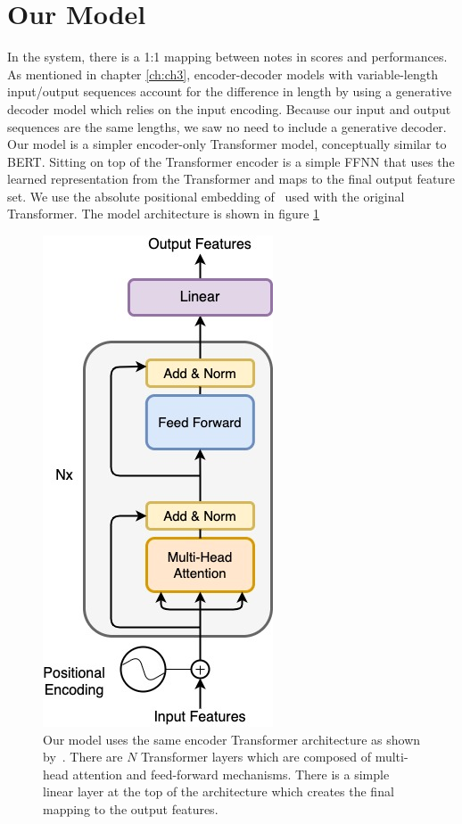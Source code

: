 \section{Our Model}
In the \vnet{} system, there is a 1:1 mapping between notes in scores and performances. As mentioned in chapter \ref{ch:ch3}, encoder-decoder \seq{} models with variable-length input/output sequences account for the difference in length by using a generative decoder model which relies on the input encoding. Because our input and output sequences are the same lengths, we saw no need to include a generative decoder. Our model is a simpler encoder-only Transformer model, conceptually similar to BERT. Sitting on top of the Transformer encoder is a simple FFNN that uses the learned representation from the Transformer and maps to the final output feature set. We use the absolute positional embedding of~\citet{vaswani2017attention} used with the original Transformer. The model architecture is shown in figure \ref{fig:model_architecture}

\begin{figure}
    \centering
    \includegraphics[width=0.5\linewidth]{figs/ch5/model_architecture.jpg}
    \caption{Our model uses the same encoder Transformer architecture as shown by~\citet{vaswani2017attention}. There are $N$ Transformer layers which are composed of multi-head attention and feed-forward mechanisms. There is a simple linear layer at the top of the architecture which creates the final mapping to the output features.}
    \label{fig:model_architecture}
\end{figure}

